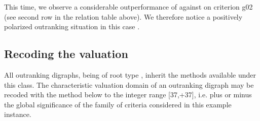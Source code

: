 \documentclass[a4paper,10pt,english]{sphinxhowto}
\begin{document}
\begin{sphinxVerbatim}[commandchars=\\\{\},numbers=left,firstnumber=1,stepnumber=1]
\end{sphinxVerbatim}

This time, we observe a considerable out\sphinxhyphen{}performance of  against  on criterion g02 (see second row in the relation table above). We therefore notice a positively polarized  outranking situation in this case .


\subsection{Recoding the valuation}
\label{\detokenize{tutorial:recoding-the-valuation}}
All outranking digraphs, being of root type , inherit the methods available under this class. The characteristic valuation domain of an outranking digraph may be recoded with the  method below to the integer range {[}\sphinxhyphen{}37,+37{]}, i.e. plus or minus the global significance of the family of criteria considered in this example instance.
\end{document}
